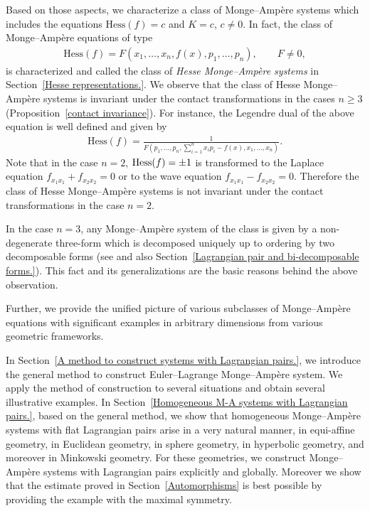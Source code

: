 \documentclass[pdftex]{sigma}
\begin{document}
Based on those aspects, we characterize a class of Monge--Amp{\`e}re systems
which includes the equations ${\mathrm{Hess}}(f) = c$ and $K = c$, $c \not= 0$.
In fact,
the class of Monge--Amp{\`e}re equations of type
\begin{gather*}
\mathrm{Hess}(f) = F(x_1, \dots, x_n, f(x), p_1, \dots, p_n), \qquad F \not= 0,
\end{gather*}
is characterized and called the class of
{\it Hesse Monge--Amp{\`e}re systems} in Section~\ref{Hesse representations.}.
We observe that the class of Hesse Monge--Amp{\`e}re systems
is invariant under the contact transformations in the cases $n \geq 3$
(Proposition~\ref{contact invariance}). For instance,
the Legendre dual of the above equation is well def\/ined and given by
\begin{gather*}
\mathrm{Hess}(f) =
\frac{1}{F\left(p_1, \dots, p_n,
\sum\limits_{i=1}^n x_i p_i - f(x), x_1, \dots, x_n\right)}.
\end{gather*}
Note that in the case $n = 2$,
${\rm Hess}(f) = \pm 1$ is transformed to
the Laplace equation \mbox{$f_{x_1x_1} {+} f_{x_2x_2} {=} 0$} or to the wave equation
$f_{x_1x_1} - f_{x_2x_2} = 0$.
Therefore the class of Hesse Monge--Amp{\`e}re systems is not invariant
under the contact transformations in the case $n = 2$.

In the case $n = 3$, any Monge--Amp{\`e}re system of the
class is given by a non-degenerate three-form
which is decomposed uniquely
up to ordering by two decomposable forms (see \cite{B1,H,K-L-R,L-R-C} and
also Section~\ref{Lagrangian pair and bi-decomposable forms.}).
This fact and
its generalizations are the basic reasons
behind the above observation.

Further, we provide the unif\/ied picture of various subclasses
of Monge--Amp{\`e}re
equations with signif\/icant examples in arbitrary dimensions from
various geometric frameworks.

In Section~\ref{A method to construct systems with Lagrangian pairs.},
we introduce the general method to construct
Euler--Lagrange Monge--Amp{\`e}re system.
We apply the method of construction to several situations and obtain
several illustrative examples.
In Section~\ref{Homogeneous M-A systems with Lagrangian pairs.},
based on the general method, we show that
homogeneous Monge--Amp{\`e}re systems with
f\/lat Lagrangian pairs arise
in a very natural manner,
in equi-af\/f\/ine geometry, in Euclidean geometry,
in sphere geometry, in hyperbolic geometry, and moreover
in Minkowski geometry.
For these geometries, we construct
Monge--Amp{\`e}re systems with Lagrangian pairs explicitly and globally.
Moreover we show that the estimate proved in Section~\ref{Automorphisms} is
best possible by providing the example with the maximal symmetry.
\end{document}
